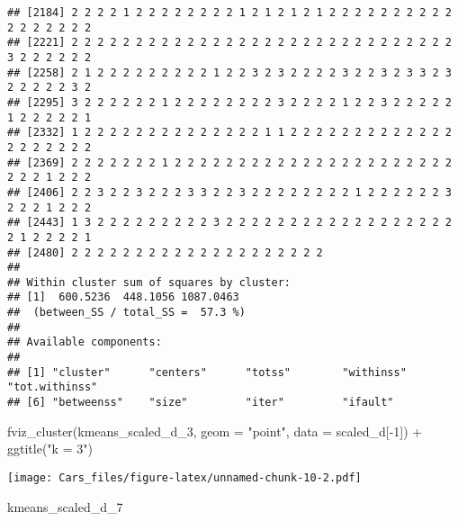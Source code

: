 \documentclass[
]{article}
\newenvironment{Shaded}{\begin{snugshade}}{\end{snugshade}}
\newcommand{\AttributeTok}[1]{\textcolor[rgb]{0.77,0.63,0.00}{#1}}
\newcommand{\DecValTok}[1]{\textcolor[rgb]{0.00,0.00,0.81}{#1}}
\newcommand{\FunctionTok}[1]{\textcolor[rgb]{0.00,0.00,0.00}{#1}}
\newcommand{\NormalTok}[1]{#1}
\newcommand{\SpecialCharTok}[1]{\textcolor[rgb]{0.00,0.00,0.00}{#1}}
\newcommand{\StringTok}[1]{\textcolor[rgb]{0.31,0.60,0.02}{#1}}
\begin{document}
\begin{verbatim}
## [2184] 2 2 2 2 1 2 2 2 2 2 2 2 2 1 2 1 2 1 2 1 2 2 2 2 2 2 2 2 2 2 2 2 2 2 2 2 2
## [2221] 2 2 2 2 2 2 2 2 2 2 2 2 2 2 2 2 2 2 2 2 2 2 2 2 2 2 2 2 2 2 3 2 2 2 2 2 2
## [2258] 2 1 2 2 2 2 2 2 2 2 2 1 2 2 3 2 3 2 2 2 2 3 2 2 3 2 3 3 2 3 2 2 2 2 2 3 2
## [2295] 3 2 2 2 2 2 2 1 2 2 2 2 2 2 2 2 3 2 2 2 2 1 2 2 3 2 2 2 2 2 1 2 2 2 2 2 1
## [2332] 1 2 2 2 2 2 2 2 2 2 2 2 2 2 2 1 1 2 2 2 2 2 2 2 2 2 2 2 2 2 2 2 2 2 2 2 2
## [2369] 2 2 2 2 2 2 2 1 2 2 2 2 2 2 2 2 2 2 2 2 2 2 2 2 2 2 2 2 2 2 2 2 2 1 2 2 2
## [2406] 2 2 3 2 2 3 2 2 2 3 3 2 2 3 2 2 2 2 2 2 2 2 1 2 2 2 2 2 2 3 2 2 2 1 2 2 2
## [2443] 1 3 2 2 2 2 2 2 2 2 2 3 2 2 2 2 2 2 2 2 2 2 2 2 2 2 2 2 2 2 2 1 2 2 2 2 1
## [2480] 2 2 2 2 2 2 2 2 2 2 2 2 2 2 2 2 2 2 2 2
## 
## Within cluster sum of squares by cluster:
## [1]  600.5236  448.1056 1087.0463
##  (between_SS / total_SS =  57.3 %)
## 
## Available components:
## 
## [1] "cluster"      "centers"      "totss"        "withinss"     "tot.withinss"
## [6] "betweenss"    "size"         "iter"         "ifault"
\end{verbatim}

\begin{Shaded}
\begin{Highlighting}[]
\FunctionTok{fviz\_cluster}\NormalTok{(kmeans\_scaled\_d\_3, }\AttributeTok{geom =} \StringTok{"point"}\NormalTok{, }\AttributeTok{data =}\NormalTok{ scaled\_d[}\SpecialCharTok{{-}}\DecValTok{1}\NormalTok{]) }\SpecialCharTok{+} \FunctionTok{ggtitle}\NormalTok{(}\StringTok{"k = 3"}\NormalTok{)}
\end{Highlighting}
\end{Shaded}

\texttt{[image: Cars\_files/figure-latex/unnamed-chunk-10-2.pdf]}

\begin{Shaded}
\begin{Highlighting}[]
\NormalTok{kmeans\_scaled\_d\_7}
\end{Highlighting}
\end{Shaded}
\end{document}

